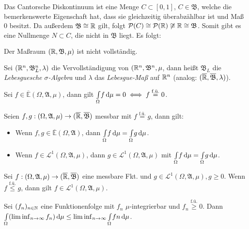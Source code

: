 \documentclass{cheat-sheet}
\newcommand{\PS}{\mathcal{P}} %
\newcommand{\Alg}{\mathfrak{A}} %
\newcommand{\Bor}{\mathfrak{B}} %
\newcommand{\E}{\mathbb{E}} %
\newcommand{\Leb}{\mathcal{L}} %
\newcommand{\fue}{\overset{\text{f.ü.}}} %
\newcommand{\IntOmu}[1]{\Int{\Omega}{}{#1}{\mu}} %
\begin{document}
\begin{bem}
  Das Cantorsche Diskontinuum ist eine Menge $C \subset [0, 1]$, $C \in \Bor$, welche die bemerkenswerte Eigenschaft hat, dass sie gleichzeitig überabzählbar ist und Maß $0$ besitzt. Da außerdem $\Bor \cong \R$ gilt, folgt $\PS(C) \cong \PS(\R) \not\cong \R \cong \Bor$. Somit gibt es eine Nullmenge $N \subset C$, die nicht in $\Bor$ liegt. Es folgt:
\end{bem}

\begin{satz}
  Der Maßraum $(\R, \Bor, \mu)$ ist nicht vollständig.
\end{satz}

\begin{defn}
  Sei $(\R^n, \Bor_L^n, \lambda)$ die Vervollständigung von $(\R^n, \Bor^n, \mu$, dann heißt $\Bor_L$ die \emph{Lebesguesche $\sigma$-Algebra} und $\lambda$ das \emph{Lebesgue-Maß} auf $\mathbb{R}^n$ (analog: $(\ER, \overline{\Bor}, \lambda)$).
\end{defn}

\begin{satz}
  Sei $f \in \overline{\E}(\Omega, \Alg, \mu)$, dann gilt $\IntOmu{f} = 0 \iff f \overset{\text{f.ü.}}= 0$.
\end{satz}

\vspace{-10pt}

\begin{satz}
  Seien $f, g : (\Omega, \Alg, \mu) \to (\ER, \overline{\Bor})$ messbar mit $f \fue= g$, dann gilt:
  \begin{itemize}
    \item Wenn $f, g \in \overline{\E}(\Omega, \Alg)$, dann $\IntOmu{f} = \IntOmu{g}$.
    \item Wenn $f \in \Leb^1(\Omega, \Alg, \mu)$, dann $g \in \Leb^1(\Omega, \Alg, \mu)$ mit $\IntOmu{f} = \IntOmu{g}$.
  \end{itemize}
\end{satz}

\begin{satz}
  Sei $f : (\Omega, \Alg, \mu) \to (\ER, \overline{\Bor})$ eine messbare Fkt. und $g \in \Leb^1(\Omega, \Alg, \mu), g \geq 0$. Wenn $f \fue\leq g$, dann gilt $f \in \Leb^1(\Omega, \Alg, \mu)$.
\end{satz}

\begin{satz}\begin{doublespace}
  Sei $(f_n)_{n \in \mathbb{N}}$ eine Funktionenfolge mit $f_n$ $\mu$-integrierbar und $f_n \overset{\text{f.ü.}}\geq 0$. Dann $\IntOmu{(\liminf_{n \to \infty} f_n)} \leq \liminf_{n \to \infty} \IntOmu{fn}$.
\end{doublespace}\end{satz}
\end{document}
